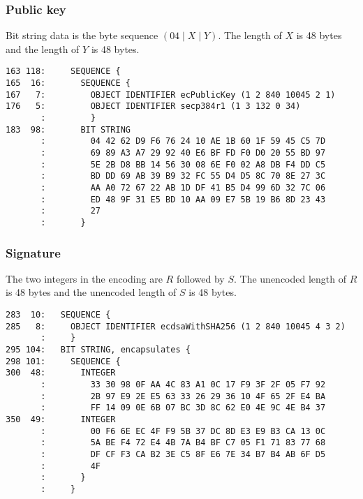 \documentclass[12pt]{article}
\begin{document}
\subsubsection{Public key}

\noindent
Bit string data is the byte sequence $(04\mid X\mid Y)$.
The length of $X$ is 48 bytes and the length of $Y$ is 48 bytes.

\begin{verbatim}
163 118:     SEQUENCE {
165  16:       SEQUENCE {
167   7:         OBJECT IDENTIFIER ecPublicKey (1 2 840 10045 2 1)
176   5:         OBJECT IDENTIFIER secp384r1 (1 3 132 0 34)
       :         }
183  98:       BIT STRING
       :         04 42 62 D9 F6 76 24 10 AE 1B 60 1F 59 45 C5 7D
       :         69 89 A3 A7 29 92 40 E6 BF FD F0 D0 20 55 BD 97
       :         5E 2B D8 BB 14 56 30 08 6E F0 02 A8 DB F4 DD C5
       :         BD DD 69 AB 39 B9 32 FC 55 D4 D5 8C 70 8E 27 3C
       :         AA A0 72 67 22 AB 1D DF 41 B5 D4 99 6D 32 7C 06
       :         ED 48 9F 31 E5 BD 10 AA 09 E7 5B 19 B6 8D 23 43
       :         27
       :       }
\end{verbatim}

\subsubsection{Signature}

\noindent
The two integers in the encoding are $R$ followed by $S$.
The unencoded length of $R$ is 48 bytes and the unencoded length of $S$ is 48 bytes.

\begin{verbatim}
283  10:   SEQUENCE {
285   8:     OBJECT IDENTIFIER ecdsaWithSHA256 (1 2 840 10045 4 3 2)
       :     }
295 104:   BIT STRING, encapsulates {
298 101:     SEQUENCE {
300  48:       INTEGER
       :         33 30 98 0F AA 4C 83 A1 0C 17 F9 3F 2F 05 F7 92
       :         2B 97 E9 2E E5 63 33 26 29 36 10 4F 65 2F E4 BA
       :         FF 14 09 0E 6B 07 BC 3D 8C 62 E0 4E 9C 4E B4 37
350  49:       INTEGER
       :         00 F6 6E EC 4F F9 5B 37 DC 8D E3 E9 B3 CA 13 0C
       :         5A BE F4 72 E4 4B 7A B4 BF C7 05 F1 71 83 77 68
       :         DF CF F3 CA B2 3E C5 8F E6 7E 34 B7 B4 AB 6F D5
       :         4F
       :       }
       :     }
\end{verbatim}
\end{document}
